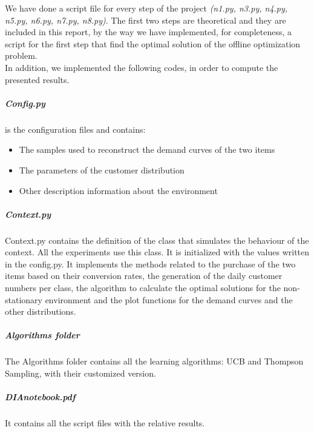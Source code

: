 We have done a script file for every step of the project \textit{(n1.py, n3.py, n4.py, n5.py, n6.py, n7.py, n8.py)}. The first two steps are theoretical and they are included in this report, by the way we have implemented, for completeness, a script for the first step that find the optimal solution of the offline optimization problem.\\
In addition, we implemented the following codes, in order to compute the presented results. 
\subparagraph*{Config.py} is the configuration files and contains:
\begin{itemize}
	\item The samples used to reconstruct the demand curves of the two items
	\item The parameters of the customer distribution
	\item Other description information about the environment
\end{itemize} 

\subparagraph*{Context.py}
Context.py contains the definition of the class that simulates the behaviour of the context. All the experiments use this class. It is initialized with the values written in the config.py. It implements the methods related to the purchase of the two items based on their conversion rates, the generation of the daily customer numbers per class, the algorithm to calculate the optimal solutions for the non-stationary environment and the plot functions for the demand curves and the other distributions.


\subparagraph*{Algorithms folder}
The Algorithms folder contains all the learning algorithms: UCB and Thompson Sampling, with their customized version.

\subparagraph*{DIAnotebook.pdf}
It contains all the script files with the relative results.